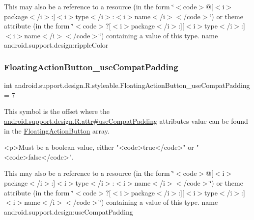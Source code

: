 This may also be a reference to a resource (in the form \char`\"{}$<$code$>$@\mbox{[}$<$i$>$package$<$/i$>$\+:\mbox{]}$<$i$>$type$<$/i$>$\+:$<$i$>$name$<$/i$>$$<$/code$>$\char`\"{}) or theme attribute (in the form \char`\"{}$<$code$>$?\mbox{[}$<$i$>$package$<$/i$>$\+:\mbox{]}\mbox{[}$<$i$>$type$<$/i$>$\+:\mbox{]}$<$i$>$name$<$/i$>$$<$/code$>$\char`\"{}) containing a value of this type.  name android.\+support.\+design\+:ripple\+Color \mbox{\label{classandroid_1_1support_1_1design_1_1R_1_1styleable_a30d672b56fb17fedc1b2c1693a6c56c4}} 
\subsubsection{\texorpdfstring{Floating\+Action\+Button\+\_\+use\+Compat\+Padding}{FloatingActionButton\_useCompatPadding}}
{\footnotesize\ttfamily int android.\+support.\+design.\+R.\+styleable.\+Floating\+Action\+Button\+\_\+use\+Compat\+Padding = 7\hspace{0.3cm}{\ttfamily [static]}}

This symbol is the offset where the \hyperlink{classandroid_1_1support_1_1design_1_1R_1_1attr_ae9972f9c82bd89aa3af6cc62b3939ecd}{android.\+support.\+design.\+R.\+attr\#use\+Compat\+Padding} attribute\textquotesingle{}s value can be found in the \hyperlink{classandroid_1_1support_1_1design_1_1R_1_1styleable_ac39eabec239d50ec950ae5f013825830}{Floating\+Action\+Button} array.

\begin{DoxyVerb}      <p>Must be a boolean value, either "<code>true</code>" or "<code>false</code>".
\end{DoxyVerb}
 

This may also be a reference to a resource (in the form \char`\"{}$<$code$>$@\mbox{[}$<$i$>$package$<$/i$>$\+:\mbox{]}$<$i$>$type$<$/i$>$\+:$<$i$>$name$<$/i$>$$<$/code$>$\char`\"{}) or theme attribute (in the form \char`\"{}$<$code$>$?\mbox{[}$<$i$>$package$<$/i$>$\+:\mbox{]}\mbox{[}$<$i$>$type$<$/i$>$\+:\mbox{]}$<$i$>$name$<$/i$>$$<$/code$>$\char`\"{}) containing a value of this type.  name android.\+support.\+design\+:use\+Compat\+Padding \mbox{\label{classandroid_1_1support_1_1design_1_1R_1_1styleable_a423286315758e65de84a49f81984f19a}} 
